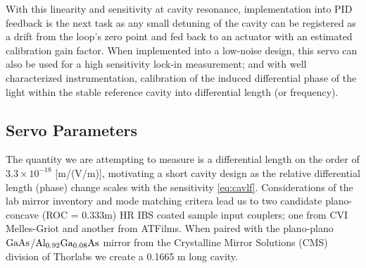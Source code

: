 With this linearity and sensitivity at cavity resonance, implementation into PID feedback is the next task as any small detuning of the cavity can be registered as a drift from the loop's zero point and fed back to an actuator with an estimated calibration gain factor. When implemented into a low-noise design, this servo can also be used for a high sensitivity lock-in measurement; and with well characterized instrumentation, calibration of the induced differential phase of the light within the stable reference cavity into differential length (or frequency).


\subsection{Servo Parameters}
The quantity we are attempting to measure is a differential length on the order of $3.3 \times 10^{-18}$ [m/(V/m)], motivating a short cavity design as the relative differential length (phase) change scales with the sensitivity \autoref{eq:cavlf}. Considerations of the lab mirror inventory and mode matching critera lead us to two candidate plano-concave (ROC = 0.333m) HR IBS coated sample input couplers; one from CVI Melles-Griot and another from ATFilms. When paired with the plano-plano $\mathrm{GaAs}$/$\mathrm{Al_{0.92}Ga_{0.08}As}$  mirror from the Crystalline Mirror Solutions (CMS) division of Thorlabs we create a 0.1665 m long cavity.


